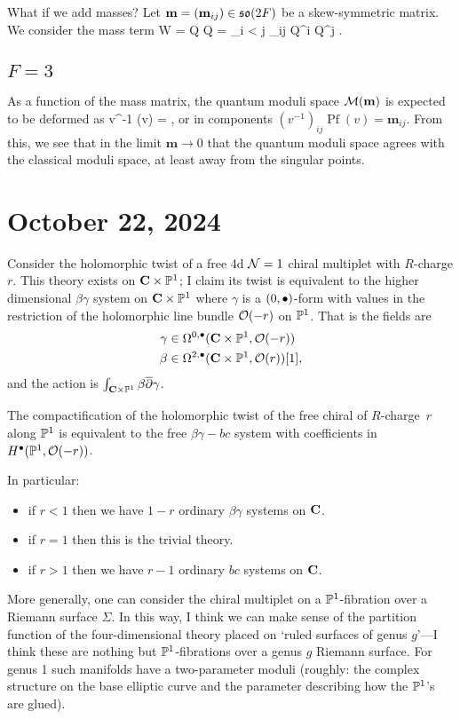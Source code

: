 \documentclass[11pt]{amsart}
\renewcommand{\op}{\operatorname}
\newcommand{\bm}{\mathbf{m}}
\begin{document}
What if we add masses?
Let $\bm = (\bm_{ij}) \in \lie{so}(2F)$ be a skew-symmetric matrix.
We consider the mass term
\beqn
W =  \bm Q Q = \sum_{i < j} \bm_{ij} Q^i Q^j .
\eeqn

\subsection{$F = 3$}
As a function of the mass matrix, the quantum moduli space $\cM(\bm)$ is expected to be deformed as
\beqn
v^{-1} \op{Pf}(v) = \bm ,
\eeqn
or in components $(v^{-1})_{ij} \op{Pf}(v) = \bm_{ij}$.
From this, we see that in the limit $\bm \to 0$ that the quantum moduli space agrees with the classical moduli space, at least away from the singular points.

\section{October 22, 2024}

Consider the holomorphic twist of a free 4d $\mathcal N=1$ chiral multiplet with $R$-charge $r$.
This theory exists on $\mathbf{C} \times \mathbb P^1$; I claim its twist is equivalent to the higher dimensional $\beta\gamma$ system on $\mathbf{C} \times \mathbb P^1$ where $\gamma$ is a $(0,\bullet)$-form with values in the restriction of the holomorphic line bundle $\mathcal O(-r)$ on $\mathbb P^1$.
That is the fields are
\begin{align*}
\gamma & \in \Omega^{0,\bullet}(\mathbf{C} \times \mathbb P^1 , \mathcal O(-r)) \\
\beta & \in \Omega^{2,\bullet}(\mathbf{C} \times \mathbb P^1, \mathcal O(r))[1] ,
\end{align*}
and the action is $\int_{\mathbf{C} \times \mathbb P^1} \beta \overline{\partial} \gamma$.

\begin{prop}
The compactification of the holomorphic twist of the free chiral of $R$-charge~$r$ along $\mathbb P^1$ is equivalent to the free $\beta\gamma-bc$ system
with coefficients in $H^\bullet(\mathbb P^1, \mathcal O(-r))$.
\end{prop}

In particular:
\begin{itemize}
\item if $r <1$ then we have $1-r$ ordinary $\beta\gamma$ systems on $\mathbf{C}$.
\item if $r =1$ then this is the trivial theory.
\item if $r > 1$ then we have $r-1$ ordinary $bc$ systems on $\mathbf{C}$.
\end{itemize}

More generally, one can consider the chiral multiplet on a $\mathbb P^1$-fibration over a Riemann surface $\Sigma$.
In this way, I think we can make sense of the partition function of the four-dimensional theory placed on `ruled surfaces of genus $g$'---I think these are nothing but $\mathbb P^1$-fibrations over a genus $g$ Riemann surface. 
For genus 1 such manifolds have a two-parameter moduli (roughly: the complex structure on the base elliptic curve and the parameter describing how the $\mathbb P^1$'s are glued).
\end{document}
